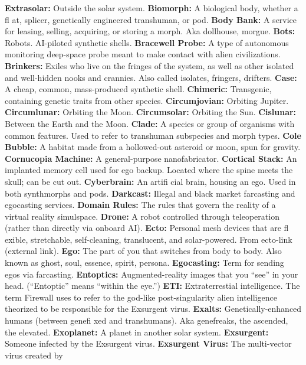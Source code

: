 \textbf{ Extrasolar:} Outside the solar system.
\textbf{ Biomorph:} A biological body, whether a ﬂ at, splicer, 
genetically engineered transhuman, or pod.
\textbf{ Body Bank:} A service for leasing, selling, acquiring, or 
storing a morph. Aka dollhouse, morgue.
\textbf{ Bots:} Robots. AI-piloted synthetic shells.
\textbf{ Bracewell Probe:} A type of autonomous monitoring deep-space probe meant to make contact with alien civilizations.
\textbf{ Brinkers:} Exiles who live on the fringes of the system, 
as well as other isolated and well-hidden nooks and 
crannies. Also called isolates, fringers, drifters.
\textbf{ Case:} A cheap, common, mass-produced synthetic shell.
\textbf{ Chimeric:} Transgenic, containing genetic traits from 
other species.
\textbf{ Circumjovian:} Orbiting Jupiter.
\textbf{ Circumlunar:} Orbiting the Moon.
\textbf{ Circumsolar:} Orbiting the Sun.
\textbf{ Cislunar:} Between the Earth and the Moon.
\textbf{ Clade:} A species or group of organisms with common 
features. Used to refer to transhuman subspecies and 
morph types. 
\textbf{ Cole Bubble:} A habitat made from a hollowed-out 
asteroid or moon, spun for gravity.
\textbf{ Cornucopia Machine:} A general-purpose nanofabricator.
\textbf{ Cortical Stack:} An implanted memory cell used for ego 
backup. Located where the spine meets the skull; can be 
cut out.
\textbf{ Cyberbrain:} An artiﬁ cial brain, housing an ego. Used in 
both synthmorphs and pods.
\textbf{ Darkcast:} Illegal and black market farcasting and 
egocasting services.
\textbf{ Domain Rules:} The rules that govern the reality of a 
virtual reality simulspace.
\textbf{ Drone:} A robot controlled through teleoperation (rather 
than directly via onboard AI).
\textbf{ Ecto:} Personal mesh devices that are ﬂ exible, stretchable, 
self-cleaning, translucent, and solar-powered. From 
ecto-link (external link).
\textbf{ Ego:} The part of you that switches from body to body. 
Also known as ghost, soul, essence, spirit, persona.
\textbf{ Egocasting:} Term for sending egos via farcasting.
\textbf{ Entoptics:} Augmented-reality images that you ``see'' in 
your head. (``Entoptic'' means ``within the eye.'')
\textbf{ ETI:} Extraterrestial intelligence. The term Firewall uses 
to refer to the god-like post-singularity alien intelligence 
theorized to be responsible for the Exsurgent virus.
\textbf{ Exalts:} Genetically-enhanced humans (between geneﬁ xed and transhumans). Aka genefreaks, the ascended, 
the elevated.
\textbf{ Exoplanet:} A planet in another solar system.
\textbf{ Exsurgent:} Someone infected by the Exsurgent virus.
\textbf{ Exsurgent Virus:} The multi-vector virus created by 
